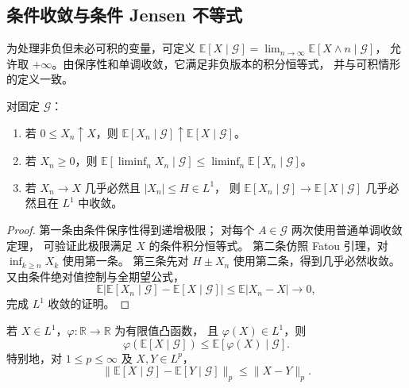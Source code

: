 \documentclass[UTF8]{ctexart}
\begin{document}
\subsection{条件收敛与条件 Jensen 不等式}

为处理非负但未必可积的变量，可定义
$\mathbb E[X\mid\mathcal G]=\lim_{n\to\infty}\mathbb E[X\wedge n\mid\mathcal G]$，
允许取 $+\infty$。由保序性和单调收敛，它满足非负版本的积分恒等式，
并与可积情形的定义一致。

\begin{proposition}[条件版本的收敛定理]
\label{prop:conditional-convergence}
对固定 $\mathcal G$：
\begin{enumerate}
  \item 若 $0\leq X_n\uparrow X$，则
    $\mathbb E[X_n\mid\mathcal G]\uparrow\mathbb E[X\mid\mathcal G]$。
  \item 若 $X_n\geq0$，则
    $\mathbb E[\liminf_nX_n\mid\mathcal G]
      \leq\liminf_n\mathbb E[X_n\mid\mathcal G]$。
  \item 若 $X_n\to X$ 几乎必然且 $|X_n|\leq H\in L^1$，
    则 $\mathbb E[X_n\mid\mathcal G]\to\mathbb E[X\mid\mathcal G]$
    几乎必然且在 $L^1$ 中收敛。
\end{enumerate}
\end{proposition}

\begin{proof}
第一条由条件保序性得到递增极限；
对每个 $A\in\mathcal G$ 两次使用普通单调收敛定理，
可验证此极限满足 $X$ 的条件积分恒等式。
第二条仿照 Fatou 引理，对 $\inf_{k\geq n}X_k$ 使用第一条。
第三条先对 $H\pm X_n$ 使用第二条，得到几乎必然收敛。
又由条件绝对值控制与全期望公式，
\[
  \mathbb E|\mathbb E[X_n\mid\mathcal G]-\mathbb E[X\mid\mathcal G]|
  \leq\mathbb E|X_n-X|\longrightarrow0,
\]
完成 $L^1$ 收敛的证明。
\end{proof}

\begin{theorem}
\label{thm:conditional-jensen}
若 $X\in L^1$，$\varphi:\mathbb R\to\mathbb R$ 为有限值凸函数，
且 $\varphi(X)\in L^1$，则
\begin{equation}
  \varphi(\mathbb E[X\mid\mathcal G])
  \leq\mathbb E[\varphi(X)\mid\mathcal G].
  \label{eq:conditional-jensen}
\end{equation}
特别地，对 $1\leq p\leq\infty$ 及 $X,Y\in L^p$，
\begin{equation}
  \|\mathbb E[X\mid\mathcal G]-\mathbb E[Y\mid\mathcal G]\|_p
  \leq\|X-Y\|_p.
  \label{eq:conditional-contraction}
\end{equation}
\end{theorem}
\end{document}
